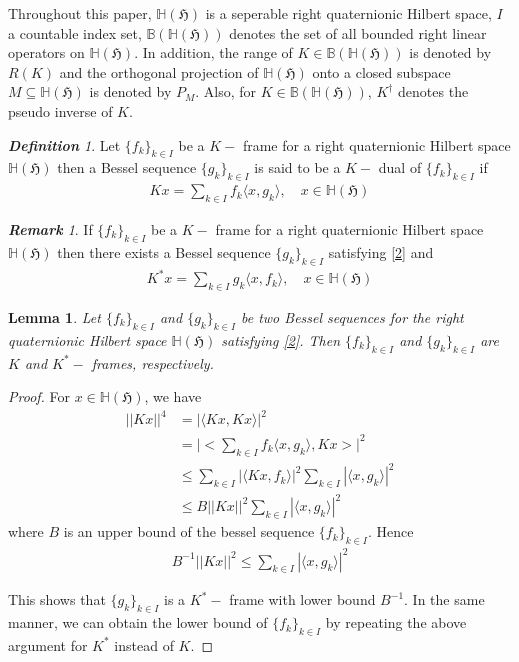 \documentclass[a4paper,12pt,reqno]{amsart}
\theoremstyle{plain}
\newtheorem{lemma}[theorem]{\bf Lemma}
\theoremstyle{remark}
\newtheorem{definition}[theorem]{\bf Definition}
\newtheorem{remark}[theorem]{\bf Remark}
\begin{document}
	Throughout this paper, $\mathbb{H}(\mathfrak{H})$ is a seperable right quaternionic Hilbert space, $I$ a countable index set, $\mathbb{B}(\mathbb{H}(\mathfrak{H}))$ denotes the set of all bounded right linear operators on $\mathbb{H}(\mathfrak{H})$. In addition, the range of $K\in\mathbb{B}(\mathbb{H}(\mathfrak{H}))$ is denoted by $R(K)$ and the orthogonal projection of $\mathbb{H}(\mathfrak{H})$ onto a closed subspace $M\subseteq \mathbb{H}(\mathfrak{H})$ is denoted by $P_M$. Also, for $K\in\mathbb{B}(\mathbb{H}(\mathfrak{H}))$, $K^{\dagger}$ denotes the pseudo inverse of $K$.
	
	\begin{definition}
		Let $\{f_k\}_{k\in I}$ be a $K-$ frame for a right quaternionic Hilbert space $\mathbb{H}(\mathfrak{H})$ then a Bessel sequence $\{g_k\}_{k\in I}$ is said to be a $K-$ dual of $\{f_k\}_{k\in I}$ if 
		\begin{align}\label{2}
			Kx= \sum_{k\in I} f_k \langle x, g_k\rangle, \quad x\in \mathbb{H}(\mathfrak{H})
		\end{align}
	\end{definition}
	\begin{remark}\cite{a}
		If $\{f_k\}_{k\in I}$ be a $K-$ frame for a right quaternionic Hilbert space $\mathbb{H}(\mathfrak{H})$ then there exists a Bessel sequence $\{g_k\}_{k\in I}$ satisfying \eqref{2} and \begin{align}
			K^*x= \sum_{k\in I} g_k \langle x, f_k\rangle, \quad x\in \mathbb{H}(\mathfrak{H})
		\end{align}
	\end{remark}
	
	\begin{lemma}\cite{a}\label{a}
		Let $\{f_k\}_{k\in I}$ and $\{g_k\}_{k\in I}$ be two Bessel sequences for the right quaternionic Hilbert space $\mathbb{H}(\mathfrak{H})$ satisfying \eqref{2}. Then $\{f_k\}_{k\in I}$ and $\{g_k\}_{k\in I}$ are $K$ and $K^*-$ frames, respectively.  
	\end{lemma}
	\begin{proof}
		For $x\in \mathbb{H}(\mathfrak{H})$, we have
		\begin{align*}
			||Kx||^4&=|\langle Kx, Kx \rangle|^2 \\ 
			&=\bigg|\biggl< \sum_{k\in I}f_k \langle x, g_k \rangle , Kx \biggr> \bigg|^2  \\
			&\leq \sum_{k\in I}|\langle Kx, f_k \rangle|^2 \sum_{k\in I} |\langle x, g_k \rangle|^2 \\
			&\leq B||Kx||^2 \sum_{k\in I} |\langle x, g_k \rangle|^2 
		\end{align*}
		where $B$ is an upper bound of the bessel sequence $\{f_k\}_{k\in I}$.
		Hence
		\begin{align*}
			B^{-1}||Kx||^2 \leq \sum_{k\in I} |\langle x, g_k \rangle|^2 
		\end{align*}
		
		This shows that $\{g_k\}_{k\in I}$ is a $K^*-$ frame with lower bound $B^{-1}$. In the same manner, we can obtain the lower bound of $\{f_k\}_{k\in I}$ by repeating the above argument for $K^*$ instead of $K$.
	\end{proof}
	
\end{document}
